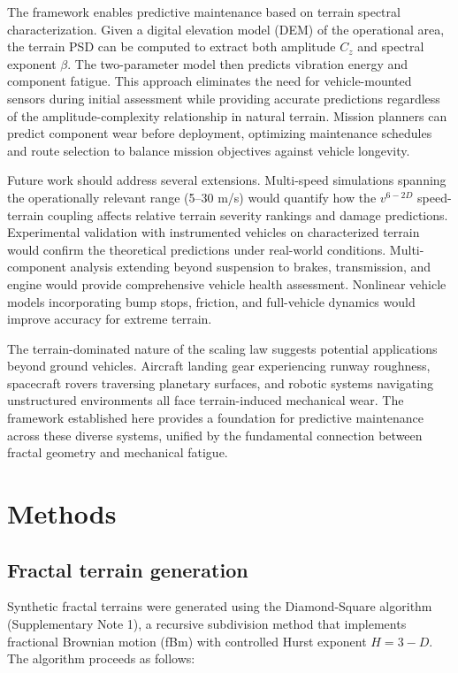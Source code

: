 \documentclass[11pt]{article}
\begin{document}
The framework enables predictive maintenance based on terrain spectral characterization. Given a digital elevation model (DEM) of the operational area, the terrain PSD can be computed to extract both amplitude $C_z$ and spectral exponent $\beta$. The two-parameter model then predicts vibration energy and component fatigue. This approach eliminates the need for vehicle-mounted sensors during initial assessment while providing accurate predictions regardless of the amplitude-complexity relationship in natural terrain. Mission planners can predict component wear before deployment, optimizing maintenance schedules and route selection to balance mission objectives against vehicle longevity.

Future work should address several extensions. Multi-speed simulations spanning the operationally relevant range (5--30 m/s) would quantify how the $v^{6-2D}$ speed-terrain coupling affects relative terrain severity rankings and damage predictions. Experimental validation with instrumented vehicles on characterized terrain would confirm the theoretical predictions under real-world conditions. Multi-component analysis extending beyond suspension to brakes, transmission, and engine would provide comprehensive vehicle health assessment. Nonlinear vehicle models incorporating bump stops, friction, and full-vehicle dynamics would improve accuracy for extreme terrain.

The terrain-dominated nature of the scaling law suggests potential applications beyond ground vehicles. Aircraft landing gear experiencing runway roughness, spacecraft rovers traversing planetary surfaces, and robotic systems navigating unstructured environments all face terrain-induced mechanical wear. The framework established here provides a foundation for predictive maintenance across these diverse systems, unified by the fundamental connection between fractal geometry and mechanical fatigue.


\section*{Methods}

\subsection*{Fractal terrain generation}

Synthetic fractal terrains were generated using the Diamond-Square algorithm\cite{Voss1985} (Supplementary Note 1), a recursive subdivision method that implements fractional Brownian motion (fBm) with controlled Hurst exponent $H = 3-D$. The algorithm proceeds as follows:
\end{document}

